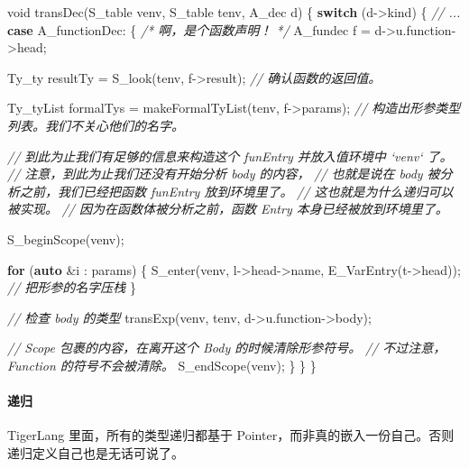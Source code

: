 \documentclass[
]{article}
\newenvironment{Shaded}{}{}
\newcommand{\CommentTok}[1]{\textcolor[rgb]{0.38,0.63,0.69}{\textit{#1}}}
\newcommand{\ControlFlowTok}[1]{\textcolor[rgb]{0.00,0.44,0.13}{\textbf{#1}}}
\newcommand{\DataTypeTok}[1]{\textcolor[rgb]{0.56,0.13,0.00}{#1}}
\newcommand{\KeywordTok}[1]{\textcolor[rgb]{0.00,0.44,0.13}{\textbf{#1}}}
\newcommand{\NormalTok}[1]{#1}
\begin{document}
\begin{Shaded}
\begin{Highlighting}[]
\DataTypeTok{void}\NormalTok{ transDec(S_table venv, S_table tenv, A_dec d) \{}
    \ControlFlowTok{switch}\NormalTok{ (d->kind) \{}
        \CommentTok{// ...}
        \ControlFlowTok{case}\NormalTok{ A_functionDec: \{}
            \CommentTok{/* 啊，是个函数声明！ */}
\NormalTok{            A_fundec f = d->u.function->head;}
            
\NormalTok{            Ty_ty resultTy = S_look(tenv, f->result);}
            \CommentTok{// 确认函数的返回值。}
            
\NormalTok{            Ty_tyList formalTys = makeFormalTyList(tenv, f->params);}
            \CommentTok{// 构造出形参类型列表。我们不关心他们的名字。}
            
            \CommentTok{// 到此为止我们有足够的信息来构造这个 funEntry 并放入值环境中 `venv` 了。}
            \CommentTok{// 注意，到此为止我们还没有开始分析 body 的内容，}
            \CommentTok{// 也就是说在 body 被分析之前，我们已经把函数 funEntry 放到环境里了。}
            \CommentTok{// 这也就是为什么递归可以被实现。}
            \CommentTok{// 因为在函数体被分析之前，函数 Entry 本身已经被放到环境里了。}
            
\NormalTok{            S_beginScope(venv);}
            
            \ControlFlowTok{for}\NormalTok{ (}\KeywordTok{auto}\NormalTok{ &i : params) \{}
\NormalTok{                S_enter(venv, l->head->name, E_VarEntry(t->head));}
                \CommentTok{// 把形参的名字压栈}
\NormalTok{            \}}
            
            \CommentTok{// 检查 body 的类型}
\NormalTok{            transExp(venv, tenv, d->u.function->body);}
            
            \CommentTok{// Scope 包裹的内容，在离开这个 Body 的时候清除形参符号。}
            \CommentTok{// 不过注意，Function 的符号不会被清除。}
\NormalTok{            S_endScope(venv);}
\NormalTok{        \}}
\NormalTok{    \}}
\NormalTok{\}}
\end{Highlighting}
\end{Shaded}

\hypertarget{header-n71}{%
\paragraph{递归}\label{header-n71}}

TigerLang 里面，所有的类型递归都基于
Pointer，而非真的嵌入一份自己。否则递归定义自己也是无话可说了。
\end{document}
